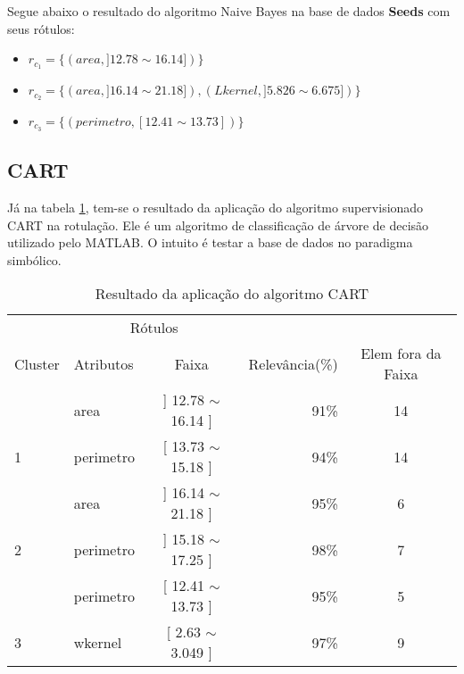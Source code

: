 Segue abaixo o resultado do algoritmo Naive Bayes na base de dados \textbf{Seeds} com seus rótulos: 
\begin{itemize}[noitemsep]
 \item ${r_{c_1}=\{ (area, ]12.78 \sim 16.14]) \} }$  
 \item ${r_{c_2}=\{ (area, ]16.14 \sim 21.18]), (Lkernel, ]5.826 \sim 6.675]) \} }$
 \item ${r_{c_3}=\{ (perimetro, [12.41 \sim 13.73])\} }$
\end{itemize}


\subsection{CART}\label{cap:resultados:ssec:seed:cart}


Já na tabela \ref{tab:rot:seeds:cart}, tem-se o resultado da aplicação do algoritmo supervisionado CART na rotulação. Ele é um algoritmo de classificação de árvore de decisão utilizado pelo MATLAB. O intuito é testar a base de dados no paradigma simbólico. 

\begin{table}[!h]
\centering
\caption{Resultado da aplicação do algoritmo CART}
\label{tab:rot:seeds:cart}
\begin{tabular}{llcrc}\hline

\multicolumn{1}{c}{\cellcolor[HTML]{FFFFFF}} & \multicolumn{2}{c}{Rótulos}                      & \multicolumn{1}{r}{}            \\ \cline{2-3}
Cluster                                      & Atributos      & \multicolumn{1}{c}{Faixa}       & \multicolumn{1}{c}{Relevância(\%)} & Elem fora da Faixa \\ \hline \hline
                                             & area           & ] 12.78 $\sim$  16.14 ]         & 91\%          & 14 \\  
\multirow{-2}{*}{1}                          & perimetro      & [ 13.73 $\sim$ 15.18 ]          & 94\%          & 14\\ \hline
                                             & area           & ] 16.14 $\sim$  21.18 ]          & 95\%         & 6 \\ 
\multirow{-2}{*}{2}                          & perimetro      & ] 15.18 $\sim$  17.25 ]          & 98\%         & 7\\  \hline
                                             & perimetro      & [ 12.41 $\sim$  13.73 ]         & 95\%          & 5 \\
\multirow{-2}{*}{3}                          & wkernel        & [ 2.63 $\sim$  3.049 ]         & 97\%           & 9\\ \hline \hline
\end{tabular}
\end{table}

